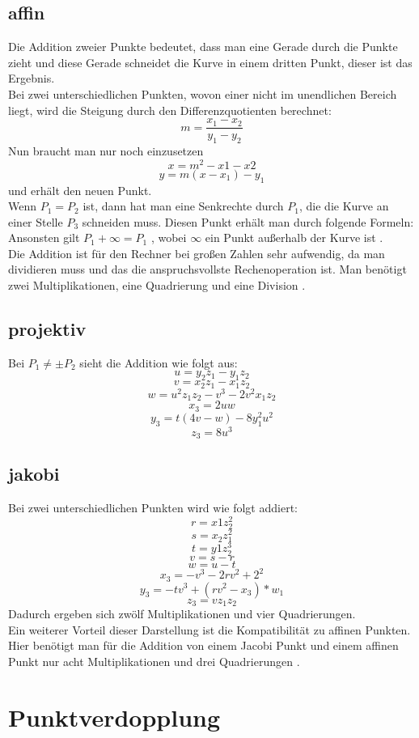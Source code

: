 \subsection{affin}
Die Addition zweier Punkte bedeutet, dass man eine Gerade durch die Punkte zieht und diese Gerade schneidet die Kurve in einem dritten Punkt, dieser ist das Ergebnis.\\
Bei zwei unterschiedlichen Punkten, wovon einer nicht im unendlichen Bereich liegt, wird die Steigung durch den Differenzquotienten berechnet: \[m = \frac{x_1-x_2}{y_1 - y_2}\]
Nun braucht man nur noch einzusetzen \[x = m^2 -x1 - x2\] \[y = m(x-x_1)-y_1\] und erhält den neuen Punkt.\\
Wenn \(P_1 = P_2\) ist, dann hat man eine Senkrechte durch \(P_1\), die die Kurve an einer Stelle \(P_3\) schneiden muss. Diesen Punkt erhält man durch folgende Formeln:\\

Ansonsten gilt \(P_1 + \infty = P_1\) , wobei \(\infty\) ein Punkt außerhalb der Kurve ist \cite{Washington2003}.\\
Die Addition ist für den Rechner bei großen Zahlen sehr aufwendig, da man dividieren muss und das die anspruchsvollste Rechenoperation ist. Man benötigt zwei Multiplikationen, eine Quadrierung und eine Division \cite{Washington2003}.
\subsection{projektiv}
Bei \(P_1 \neq \pm P_2\) sieht die Addition wie folgt aus:
\[u = y_2z_1 - y_1z_2\] \[v = x_2z_1 - x_1z_2\] \[w = u^2z_1z_2 - v^3 -2v^2x_1z_2\] \[x_3 = 2uw\] \[y_3 = t(4v -w)-8y_1^2u^2\] \[z_3 = 8u^3\]
\subsection{jakobi}
Bei zwei unterschiedlichen Punkten wird wie folgt addiert:
\[r = x1z_2^2\] \[s = x_2z_1^2\] \[t = y1z_2^3\] \[v = s - r\] \[w = u - t\] \[x_3 = -v^3 - 2rv^2 + 2^2\] \[y_3 = -tv^3 + (rv^2-x_3)*w_1\] \[z_3 = vz_1z_2\]
Dadurch ergeben sich zwölf Multiplikationen und vier Quadrierungen.\\
Ein weiterer Vorteil dieser Darstellung ist die Kompatibilität zu affinen Punkten. Hier benötigt man für die Addition von einem Jacobi Punkt und einem affinen Punkt nur acht Multiplikationen und drei Quadrierungen \cite{Washington2003}.


\section{Punktverdopplung}
